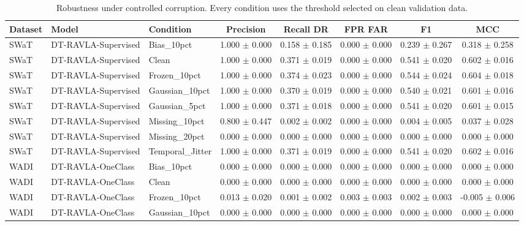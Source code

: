 \begin{table}[t]
\centering
\caption{Robustness under controlled corruption. Every condition uses the threshold selected on clean validation data.}
\label{tab:robustness}
\renewcommand{\arraystretch}{1.12}
\setlength{\tabcolsep}{4pt}
\begin{tabular}{lllccccc}
\hline
Dataset & Model & Condition & Precision & Recall DR & FPR FAR & F1 & MCC \\
\hline
SWaT & DT-RAVLA-Supervised & Bias_10pct & 1.000 $\pm$ 0.000 & 0.158 $\pm$ 0.185 & 0.000 $\pm$ 0.000 & 0.239 $\pm$ 0.267 & 0.318 $\pm$ 0.258 \\
SWaT & DT-RAVLA-Supervised & Clean & 1.000 $\pm$ 0.000 & 0.371 $\pm$ 0.019 & 0.000 $\pm$ 0.000 & 0.541 $\pm$ 0.020 & 0.602 $\pm$ 0.016 \\
SWaT & DT-RAVLA-Supervised & Frozen_10pct & 1.000 $\pm$ 0.000 & 0.374 $\pm$ 0.023 & 0.000 $\pm$ 0.000 & 0.544 $\pm$ 0.024 & 0.604 $\pm$ 0.018 \\
SWaT & DT-RAVLA-Supervised & Gaussian_10pct & 1.000 $\pm$ 0.000 & 0.370 $\pm$ 0.019 & 0.000 $\pm$ 0.000 & 0.540 $\pm$ 0.021 & 0.601 $\pm$ 0.016 \\
SWaT & DT-RAVLA-Supervised & Gaussian_5pct & 1.000 $\pm$ 0.000 & 0.371 $\pm$ 0.018 & 0.000 $\pm$ 0.000 & 0.541 $\pm$ 0.020 & 0.601 $\pm$ 0.015 \\
SWaT & DT-RAVLA-Supervised & Missing_10pct & 0.800 $\pm$ 0.447 & 0.002 $\pm$ 0.002 & 0.000 $\pm$ 0.000 & 0.004 $\pm$ 0.005 & 0.037 $\pm$ 0.028 \\
SWaT & DT-RAVLA-Supervised & Missing_20pct & 0.000 $\pm$ 0.000 & 0.000 $\pm$ 0.000 & 0.000 $\pm$ 0.000 & 0.000 $\pm$ 0.000 & 0.000 $\pm$ 0.000 \\
SWaT & DT-RAVLA-Supervised & Temporal_Jitter & 1.000 $\pm$ 0.000 & 0.371 $\pm$ 0.019 & 0.000 $\pm$ 0.000 & 0.541 $\pm$ 0.020 & 0.602 $\pm$ 0.016 \\
WADI & DT-RAVLA-OneClass & Bias_10pct & 0.000 $\pm$ 0.000 & 0.000 $\pm$ 0.000 & 0.000 $\pm$ 0.000 & 0.000 $\pm$ 0.000 & 0.000 $\pm$ 0.000 \\
WADI & DT-RAVLA-OneClass & Clean & 0.000 $\pm$ 0.000 & 0.000 $\pm$ 0.000 & 0.000 $\pm$ 0.000 & 0.000 $\pm$ 0.000 & 0.000 $\pm$ 0.000 \\
WADI & DT-RAVLA-OneClass & Frozen_10pct & 0.013 $\pm$ 0.020 & 0.001 $\pm$ 0.002 & 0.003 $\pm$ 0.003 & 0.002 $\pm$ 0.003 & -0.005 $\pm$ 0.006 \\
WADI & DT-RAVLA-OneClass & Gaussian_10pct & 0.000 $\pm$ 0.000 & 0.000 $\pm$ 0.000 & 0.000 $\pm$ 0.000 & 0.000 $\pm$ 0.000 & 0.000 $\pm$ 0.000 \\

\end{tabular}
\end{table}
